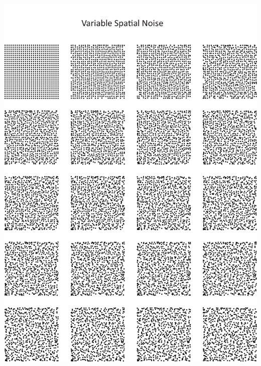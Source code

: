\documentclass[
  12pt,
  a4paper, twoside]{book}
\begin{document}
\begin{center}\includegraphics[width=1\linewidth]{Appendix/noise} \end{center}
\end{document}
